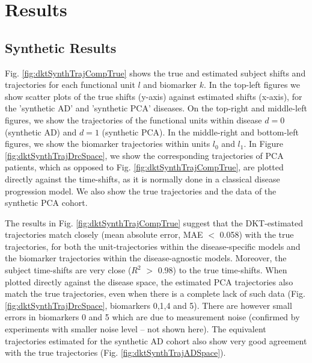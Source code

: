 \section{Results}
\label{sec:dktRes}

\subsection{Synthetic Results}
\label{sec:dktResSyn}

Fig. \ref{fig:dktSynthTrajCompTrue} shows the true and estimated subject shifts and trajectories for each functional unit $l$ and biomarker $k$. In the top-left figures we show scatter plots of the true shifts (y-axis) against estimated shifts (x-axis), for the 'synthetic AD' and 'synthetic PCA' diseases. On the top-right and middle-left figures, we show the trajectories of the functional units within disease $d=0$ (synthetic AD) and $d=1$ (synthetic PCA). In the middle-right and bottom-left figures, we show the biomarker trajectories within units $l_0$ and $l_1$. In Figure \ref{fig:dktSynthTrajDrcSpace}, we show the corresponding trajectories of PCA patients, which as opposed to Fig. \ref{fig:dktSynthTrajCompTrue}, are plotted directly against the time-shifts, as it is normally done in a classical disease progression model. We also show the true trajectories and the data of the synthetic PCA cohort.

The results in Fig. \ref{fig:dktSynthTrajCompTrue} suggest that the DKT-estimated trajectories match closely (mean absolute error, MAE $<$ 0.058) with the true trajectories, for both the unit-trajectories within the disease-specific models and the biomarker trajectories within the disease-agnostic models. Moreover, the subject time-shifts are very close ($R^2$ $>$ 0.98) to the true time-shifts. When plotted directly against the disease space, the estimated PCA trajectories also match the true trajectories, even when there is a complete lack of such data (Fig. \ref{fig:dktSynthTrajDrcSpace}, biomarkers 0,1,4 and 5). There are however small errors in  biomarkers 0 and 5 which are due to measurement noise (confirmed by experiments with smaller noise level -- not shown here). The equivalent trajectories estimated for the synthetic AD cohort also show very good agreement with the true trajectories (Fig. \ref{fig:dktSynthTrajADSpace}).


